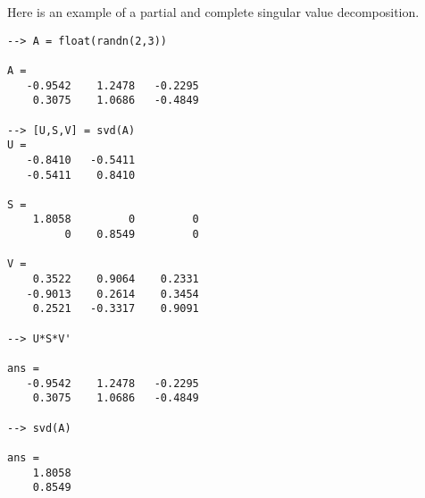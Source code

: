 Here is an example of a partial and complete singular value
decomposition.
\begin{verbatim}
--> A = float(randn(2,3))

A = 
   -0.9542    1.2478   -0.2295 
    0.3075    1.0686   -0.4849 

--> [U,S,V] = svd(A)
U = 
   -0.8410   -0.5411 
   -0.5411    0.8410 

S = 
    1.8058         0         0 
         0    0.8549         0 

V = 
    0.3522    0.9064    0.2331 
   -0.9013    0.2614    0.3454 
    0.2521   -0.3317    0.9091 

--> U*S*V'

ans = 
   -0.9542    1.2478   -0.2295 
    0.3075    1.0686   -0.4849 

--> svd(A)

ans = 
    1.8058 
    0.8549 
\end{verbatim}
